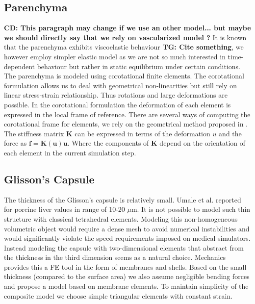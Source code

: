 \documentclass{llncs}
\newcommand{\TG}[1]{{\color{blue}\textbf{TG: #1}}}
\newcommand{\CD}[1]{{\color{green}\textbf{CD: #1}}}
\newcommand{\Vec}[1]{\mathbf{#1}}
\newcommand{\Mat}[1]{\mathbf{#1}}
\begin{document}
\subsection{Parenchyma} %

\CD{This paragraph may change if we use an other model... but maybe we should directly say that we rely on vascularized model ?}
It is known that the parenchyma exhibits viscoelastic behaviour \TG{Cite
something}, we however employ simpler elastic model as we are not so much
interested in time-dependent behaviour but rather in static equilibrium
under certain conditions.
%
The parenchyma is modeled using corotational finite elements. The corotational
formulation allows us to deal with geometrical non-linearities but still
rely on linear stress-strain relationship. Thus rotations and large
deformations are possible. In the corotational formulation the deformation
of each element is expressed in the local frame of reference. There are
several ways of computing the corotational frame for elements, we rely on
the geometrical method proposed in \cite{Nesme2005}.
The stiffness matrix $\Mat{K}$ can be expressed in terms of the deformation
$u$ and the force as $\Vec{f} = \Mat{K}(\Vec{u}) \Vec{u}$. Where the
components of $\Mat{K}$ depend on the orientation of each element in the
current simulation step.


\subsection{Glisson's Capsule} %

The thickness of the Glisson's capsule is relatively small. Umale et al.
\cite{Umale2011} reported for porcine liver values in range of 10-20
$\mu$m.
It is not possible to model such thin structure with classical tetrahedral
elements. Modeling this non-homogeneous volumetric object would require a
dense mesh to avoid numerical instabilities and would significantly
violate the speed requirements imposed on medical simulators.
Instead modeling the capsule with two-dimensional elements that abstract from the
thickness in the third dimension seems
as a natural choice. Mechanics provides this a FE tool in the form of membranes
and shells. Based on the small thickness (compared to the surface area) we also
assume negligible bending forces and propose a model based on membrane
elements. 
To maintain simplicity of the composite model we choose simple triangular
elements with constant strain.
\end{document}

